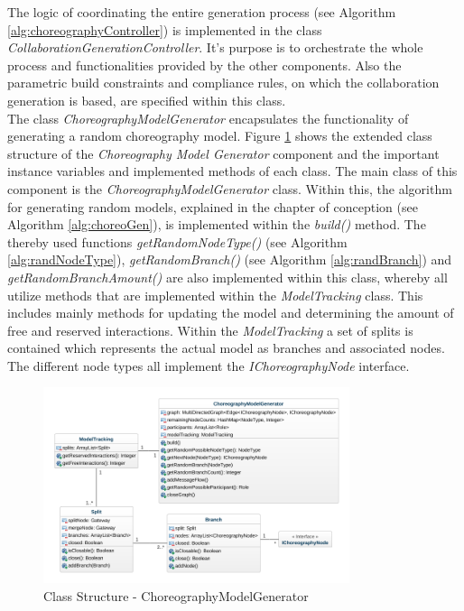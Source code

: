 The logic of coordinating the entire generation process (see Algorithm \ref{alg:choreographyController}) is implemented in the class \textit{CollaborationGenerationController}. It's purpose is to orchestrate the whole process and functionalities provided by the other components. Also the parametric build constraints and compliance rules, on which the collaboration generation is based, are specified within this class.\\

The class \textit{ChoreographyModelGenerator} encapsulates the functionality of generating a random choreography model. Figure \ref{fig:impl_chormodelgen_overview} shows the extended class structure of the \textit{Choreography Model Generator} component and the important instance variables and implemented methods of each class. The main class of this component is the \textit{ChoreographyModelGenerator} class. Within this, the algorithm for generating random models, explained in the chapter of conception (see Algorithm \ref{alg:choreoGen}), is implemented within the \textit{build()} method. The thereby used functions \textit{getRandomNodeType()} (see Algorithm \ref{alg:randNodeType}), \textit{getRandomBranch()} (see Algorithm \ref{alg:randBranch}) and \textit{getRandomBranchAmount()} are also implemented within this class, whereby all utilize methods that are implemented within the \textit{ModelTracking} class. This includes mainly methods for updating the model and determining the amount of free and reserved interactions. Within the \textit{ModelTracking} a set of splits is contained which represents the actual model as branches and associated nodes. The different node types all implement the \textit{IChoreographyNode} interface. 

\begin{figure}[H]
\centering
\includegraphics[width=0.8\textwidth]{src/images/chormodelgenerator_class.png}
\caption{Class Structure - ChoreographyModelGenerator}
\label{fig:impl_chormodelgen_overview}
\end{figure}

